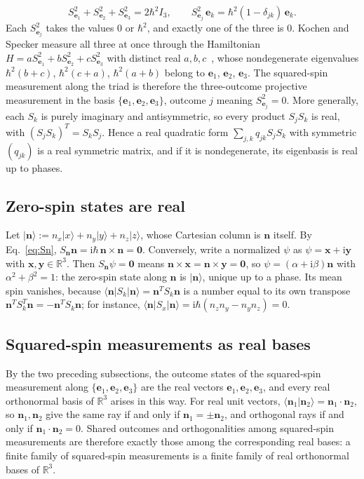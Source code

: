 \documentclass[twocolumn,aps,pra,floatfix,amsmath,amssymb,longbibliography]{revtex4-2}
\newcommand{\ii}{\mathrm{i}}
\newcommand{\R}{\mathbb{R}}
\begin{document}
\begin{equation}
 S_{\mathbf e_1}^2+S_{\mathbf e_2}^2+S_{\mathbf e_3}^2=2\hbar^2I_3,
 \qquad
 S_{\mathbf e_j}^2\,\mathbf e_k=\hbar^2(1-\delta_{jk})\,\mathbf e_k.
 \label{eq:triad}
\end{equation}
Each $S_{\mathbf e_j}^2$ takes the values $0$ or $\hbar^2$, and exactly one of the three is $0$.  Kochen and Specker measure all three at once through the Hamiltonian $H=aS_{\mathbf e_1}^2+bS_{\mathbf e_2}^2+cS_{\mathbf e_3}^2$ with distinct real $a,b,c$~\cite{kochen1}, whose nondegenerate eigenvalues $\hbar^2(b+c)$, $\hbar^2(c+a)$, $\hbar^2(a+b)$ belong to $\mathbf e_1$, $\mathbf e_2$, $\mathbf e_3$.  The squared-spin measurement along the triad is therefore the three-outcome projective measurement in the basis $\{\mathbf e_1,\mathbf e_2,\mathbf e_3\}$, outcome $j$ meaning $S_{\mathbf e_j}^2=0$.  More generally, each $S_k$ is purely imaginary and antisymmetric, so every product $S_jS_k$ is real, with $(S_jS_k)^T=S_kS_j$.  Hence a real quadratic form $\sum_{j,k}q_{jk}S_jS_k$ with symmetric $(q_{jk})$ is a real symmetric matrix, and if it is nondegenerate, its eigenbasis is real up to phases.

\subsection{Zero-spin states are real}
Let $|\mathbf n\rangle:=n_x|x\rangle+n_y|y\rangle+n_z|z\rangle$, whose Cartesian column is $\mathbf n$ itself.  By Eq.~\eqref{eq:Sn}, $S_{\mathbf n}\mathbf n=\ii\hbar\,\mathbf n\times\mathbf n=\mathbf 0$.  Conversely, write a normalized $\psi$ as $\psi=\mathbf x+\ii\mathbf y$ with $\mathbf x,\mathbf y\in\R^3$.  Then $S_{\mathbf n}\psi=\mathbf 0$ means $\mathbf n\times\mathbf x=\mathbf n\times\mathbf y=\mathbf 0$, so $\psi=(\alpha+\ii\beta)\mathbf n$ with $\alpha^2+\beta^2=1$: the zero-spin state along $\mathbf n$ is $|\mathbf n\rangle$, unique up to a phase.  Its mean spin vanishes, because $\langle\mathbf n|S_k|\mathbf n\rangle=\mathbf n^TS_k\mathbf n$ is a number equal to its own transpose $\mathbf n^TS_k^T\mathbf n=-\mathbf n^TS_k\mathbf n$; for instance, $\langle\mathbf n|S_x|\mathbf n\rangle=\ii\hbar(n_zn_y-n_yn_z)=0$.

\subsection{Squared-spin measurements as real bases}
By the two preceding subsections, the outcome states of the squared-spin measurement along $\{\mathbf e_1,\mathbf e_2,\mathbf e_3\}$ are the real vectors $\mathbf e_1,\mathbf e_2,\mathbf e_3$, and every real orthonormal basis of $\R^3$ arises in this way.  For real unit vectors, $\langle\mathbf n_1|\mathbf n_2\rangle=\mathbf n_1\cdot\mathbf n_2$, so $\mathbf n_1,\mathbf n_2$ give the same ray if and only if $\mathbf n_1=\pm\mathbf n_2$, and orthogonal rays if and only if $\mathbf n_1\cdot\mathbf n_2=0$.  Shared outcomes and orthogonalities among squared-spin measurements are therefore exactly those among the corresponding real bases: a finite family of squared-spin measurements is a finite family of real orthonormal bases of $\R^3$.
\end{document}
